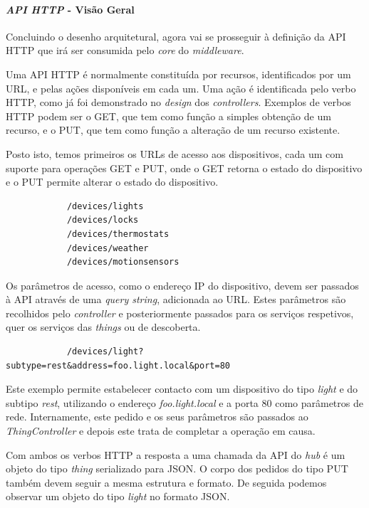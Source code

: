 %
%
%
%

\paragraph*{\textit{API HTTP} - Visão Geral}

Concluindo o desenho arquitetural, agora vai se prosseguir à definição da API HTTP que irá ser consumida pelo \textit{core} do \textit{middleware}.

Uma API HTTP é normalmente constituída por recursos, identificados por um URL, e pelas ações disponíveis em cada um. Uma ação é identificada pelo verbo HTTP, como já foi demonstrado no \textit{design} dos \textit{controllers}. Exemplos de verbos HTTP podem ser o GET, que tem como função a simples obtenção de um recurso, e o PUT, que tem como função a alteração de um recurso existente.

Posto isto, temos primeiros os URLs de acesso aos dispositivos, cada um com suporte para operações GET e PUT, onde o GET retorna o estado do dispositivo e o PUT permite alterar o estado do dispositivo.

\begin{verbatim}
            /devices/lights
            /devices/locks
            /devices/thermostats
            /devices/weather
            /devices/motionsensors
\end{verbatim}

Os parâmetros de acesso, como o endereço IP do dispositivo, devem ser passados à API através de uma \textit{query string}, adicionada ao URL. Estes parâmetros são recolhidos pelo \textit{controller} e posteriormente passados para os serviços respetivos, quer os serviços das \textit{things} ou de descoberta.

\begin{verbatim}
            /devices/light?subtype=rest&address=foo.light.local&port=80
\end{verbatim}

Este exemplo permite estabelecer contacto com um dispositivo do tipo \textit{light} e do subtipo \textit{rest}, utilizando o endereço \textit{foo.light.local} e a porta 80 como parâmetros de rede. Internamente, este pedido e os seus parâmetros são passados ao \textit{ThingController} e depois este trata de completar a operação em causa.

Com ambos os verbos HTTP a resposta a uma chamada da API do \textit{hub} é um objeto do tipo \textit{thing} serializado para JSON. O corpo dos pedidos do tipo PUT também devem seguir a mesma estrutura e formato. De seguida podemos observar um objeto do tipo \textit{light} no formato JSON.

